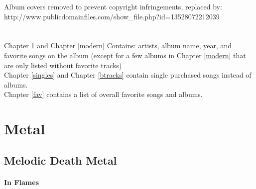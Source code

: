 Album covers removed to prevent copyright infringements, replaced by:\\ http://www.publicdomainfiles.com/show\_file.php?id=13528072212039\\
\ \\
\ \\
Chapter \ref{metal} and Chapter \ref{modern} Contains: artists, album name, year, and favorite songs on the album (except for a few albums in Chapter \ref{modern} that are only listed without favorite tracks)\\
Chapter \ref{singles} and Chapter \ref{btracks} contain single purchased songs instead of albums.\\
Chapter \ref{fav} contains a list of overall favorite songs and albums.\\

\chapter{Metal}\label{metal}

\section{Melodic Death Metal}

\subsubsection{In Flames}

